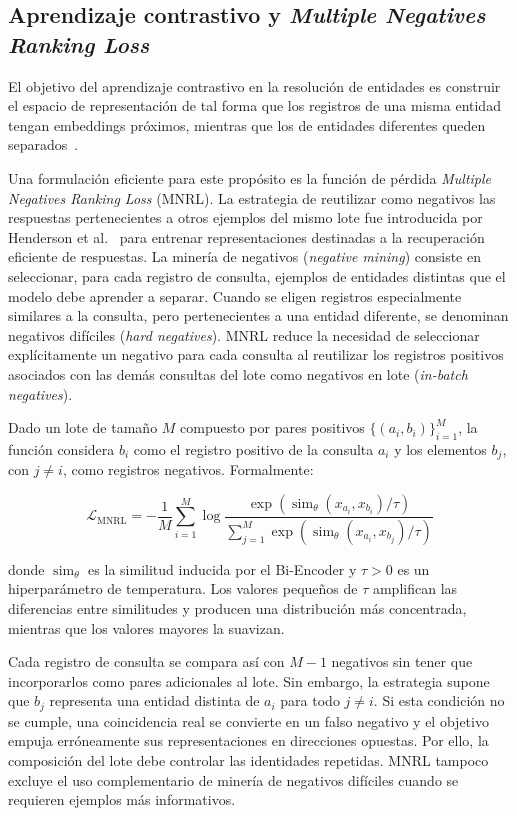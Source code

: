 \subsection{Aprendizaje contrastivo y \textit{Multiple Negatives Ranking Loss}}
\label{sec:aprendizaje_contrastivo}
El objetivo del aprendizaje contrastivo en la resolución de entidades es construir el espacio de representación de tal forma que los registros de una misma entidad tengan embeddings próximos, mientras que los de entidades diferentes queden separados~\cite{hadsell2006}.

Una formulación eficiente para este propósito es la función de pérdida \textit{Multiple Negatives Ranking Loss} (MNRL). La estrategia de reutilizar como negativos las respuestas pertenecientes a otros ejemplos del mismo lote fue introducida por Henderson et al.~\cite{henderson2017} para entrenar representaciones destinadas a la recuperación eficiente de respuestas. La minería de negativos (\textit{negative mining}) consiste en seleccionar, para cada registro de consulta, ejemplos de entidades distintas que el modelo debe aprender a separar. Cuando se eligen registros especialmente similares a la consulta, pero pertenecientes a una entidad diferente, se denominan negativos difíciles (\textit{hard negatives}). MNRL reduce la necesidad de seleccionar explícitamente un negativo para cada consulta al reutilizar los registros positivos asociados con las demás consultas del lote como negativos en lote (\textit{in-batch negatives}).

Dado un lote de tamaño $M$ compuesto por pares positivos $\{(a_i,b_i)\}_{i=1}^{M}$, la función considera $b_i$ como el registro positivo de la consulta $a_i$ y los elementos $b_j$, con $j\neq i$, como registros negativos. Formalmente:

\begin{equation}
\mathcal{L}_{\text{MNRL}}
=
-\frac{1}{M}\sum_{i=1}^{M}
\log
\frac{
\exp\!\left(\operatorname{sim}_\theta(x_{a_i},x_{b_i})/\tau\right)
}{
\sum_{j=1}^{M}
\exp\!\left(\operatorname{sim}_\theta(x_{a_i},x_{b_j})/\tau\right)
}
\label{eq:mnrl}
\end{equation}

donde $\operatorname{sim}_\theta$ es la similitud inducida por el Bi-Encoder y $\tau>0$ es un hiperparámetro de temperatura. Los valores pequeños de $\tau$ amplifican las diferencias entre similitudes y producen una distribución más concentrada, mientras que los valores mayores la suavizan.

Cada registro de consulta se compara así con $M-1$ negativos sin tener que incorporarlos como pares adicionales al lote. Sin embargo, la estrategia supone que $b_j$ representa una entidad distinta de $a_i$ para todo $j\neq i$. Si esta condición no se cumple, una coincidencia real se convierte en un falso negativo y el objetivo empuja erróneamente sus representaciones en direcciones opuestas. Por ello, la composición del lote debe controlar las identidades repetidas. MNRL tampoco excluye el uso complementario de minería de negativos difíciles cuando se requieren ejemplos más informativos.

